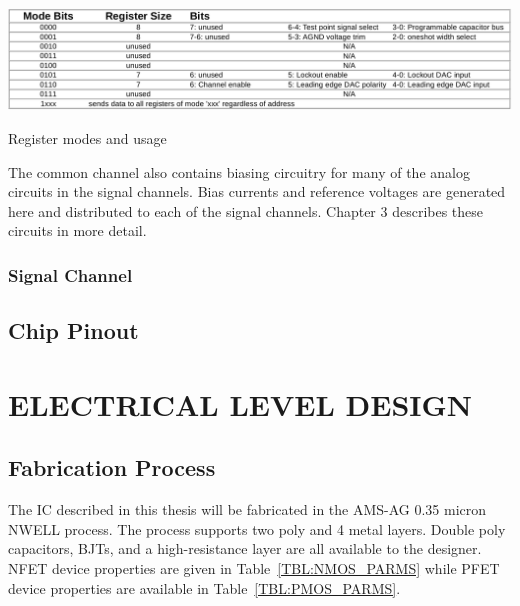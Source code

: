 \documentclass[12pt,oneside,final]{siuethesis}
\theoremstyle{definition}
\begin{document}
\begin{table}[ht]
\centering
\includegraphics[scale=.3,keepaspectratio=true]{../data/modes.png} 
\caption{Register modes and usage}
\label{tab:modes}
\end{table}

\par The common channel also contains biasing circuitry for many of the analog circuits in the signal channels. Bias currents and reference voltages are generated here and distributed to each of the signal channels. Chapter 3 describes these circuits in more detail.

\subsection{Signal Channel}

\section{Chip Pinout}



\chapter{ELECTRICAL LEVEL DESIGN}

\section{Fabrication Process}

The IC described in this thesis will be fabricated in the AMS-AG 0.35 micron NWELL process.  The process supports two poly and 4 metal layers. Double poly capacitors, BJTs, and a high-resistance layer are all available to the designer. NFET device properties are given in Table~\ref{TBL:NMOS_PARMS} while PFET device properties are available in Table~\ref{TBL:PMOS_PARMS}.

\end{document}
